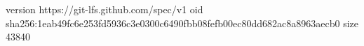 version https://git-lfs.github.com/spec/v1
oid sha256:1eab49fc6e253fd5936c3e0300c6490fbb08fefb00ec80dd682ac8a8963aecb0
size 43840
